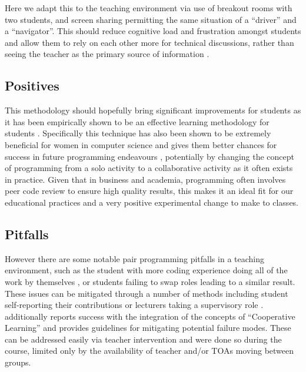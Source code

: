 \documentclass[paper=a4,justified,a4paper]{tufte-handout}
\begin{document}
Here we adapt this to the teaching environment via use of breakout rooms
with two students, and screen sharing permitting the same situation of a
``driver'' and a ``navigator''. This should reduce cognitive load and
frustration amongst students and allow them to rely on each other more
for technical discussions, rather than seeing the teacher as the primary
source of information \citep{Williams_2001}.

\hypertarget{positives}{%
\subsection{Positives}\label{positives}}

This methodology should hopefully bring significant improvements for
students as it has been empirically shown to be an effective learning
methodology for students
\citep{mendes2005investigating, mendes2006replicated}. Specifically this
technique has also been shown to be extremely beneficial for women in
computer science and gives them better chances for success in future
programming endeavours \citep{werner2004pair}, potentially by changing
the concept of programming from a solo activity to a collaborative
activity as it often exists in practice. Given that in business and
academia, programming often involves peer code review to ensure high
quality results, this makes it an ideal fit for our educational
practices and a very positive experimental change to make to classes.

\hypertarget{pitfalls}{%
\subsection{Pitfalls}\label{pitfalls}}

However there are some notable pair programming pitfalls in a teaching
environment, such as the student with more coding experience doing all
of the work by themselves
\citep{cliburn2003experiences, Williams_2002, mcdowell2003experimenting},
or students failing to swap roles leading to a similar result. These
issues can be mitigated through a number of methods including student
self-reporting their contributions or lecturers taking a supervisory
role \citep{Williams_2002}. \citet{Mentz_2008} additionally reports
success with the integration of the concepts of ``Cooperative Learning''
and provides guidelines for mitigating potential failure modes. These
can be addressed easily via teacher intervention and were done so during
the course, limited only by the availability of teacher and/or TOAs
moving between groups.
\end{document}
